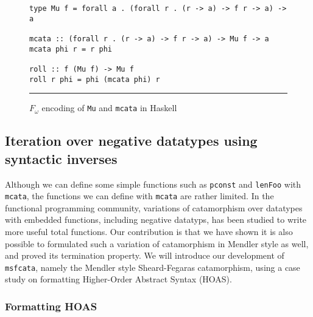 \begin{figure}
\begin{verbatim}
type Mu f = forall a . (forall r . (r -> a) -> f r -> a) -> a

mcata :: (forall r . (r -> a) -> f r -> a) -> Mu f -> a
mcata phi r = r phi

roll :: f (Mu f) -> Mu f
roll r phi = phi (mcata phi) r
\end{verbatim}
\caption{$F_{\omega}$ encoding of \texttt{Mu} and \texttt{mcata} in Haskell}
\label{fig:proof}
\vspace*{.5em}\hrule
\end{figure}

\subsection{Iteration over negative datatypes using syntactic inverses}
\label{ssec:msfcata}
Although we can define some simple functions such as \texttt{pconst} and
\texttt{lenFoo} with \texttt{mcata}, the functions we can define with
\texttt{mcata} are rather limited. In the functional programming community,
variations of catamorphism over datatypes with embedded functions, including
negative datatyps, has been studied to write more useful total functions.
Our contribution is that we have shown it is also possible to formulated
such a variation of catamorphism in Mendler style as well, and proved its
termination property. We will introduce our development of \texttt{msfcata},
namely the Mendler style Sheard-Fegaras catamorphism, using a case
study on formatting Higher-Order Abstract Syntax (HOAS).

\subsubsection{Formatting HOAS} \label{sec:bg:showHOAS}

